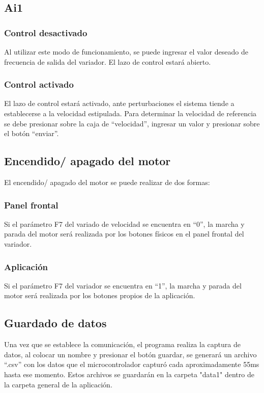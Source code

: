\subsection{Ai1}
\subsubsection{Control desactivado}
Al utilizar este modo de funcionamiento, se puede ingresar el valor deseado de frecuencia de salida del variador. El lazo de control estará abierto.

\subsubsection{Control activado}
El lazo de control estará activado, ante perturbaciones el sistema tiende a establecerse a la velocidad estipulada. Para determinar la velocidad de referencia se debe presionar sobre la caja de “velocidad”, ingresar un valor y presionar sobre el botón “enviar”.

\subsection{Encendido/ apagado del motor}
El encendido/ apagado del motor se puede realizar de dos formas:
\subsubsection{Panel frontal}
Si el parámetro F7 del variado de velocidad se encuentra en “0”, la marcha y parada del motor será realizada por los botones físicos en el panel frontal del variador.
\subsubsection{Aplicación}
Si el parámetro F7 del variador se encuentra en “1”, la marcha y parada del motor será realizada por los botones propios de la aplicación.


\subsection{Guardado de datos}
Una vez que se establece la comunicación, el programa realiza la captura de datos, al colocar un nombre y presionar el botón guardar, se generará un archivo “.csv” con los datos que el microcontrolador capturó cada aproximadamente 55ms hasta ese momento. Estos archivos se guardarán en la carpeta "data1{}" dentro de la carpeta general de la aplicación. 

